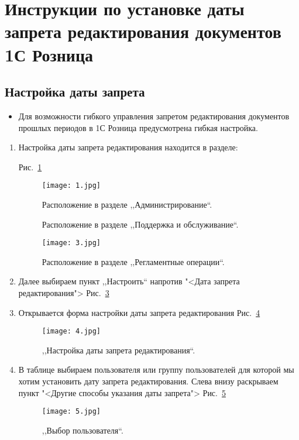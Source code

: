 \section{Инструкции по установке даты запрета редактирования документов 1С Розница}

\subsection{Настройка даты запрета}

\begin{itemize}
	\item Для возможности гибкого управления запретом редактирования документов прошлых периодов в 1С Розница предусмотрена гибкая настройка.
\end{itemize}	
\begin{enumerate}	
	\item Настройка даты запрета редактирования находится в разделе:\par 
	 Рис.~\ref{ris:1.jpg}
	\begin{figure}[H]
		\texttt{[image: 1.jpg]}
		\caption{Расположение в разделе ,,Администрирование``.}
		\label{ris:1.jpg}
	\end{figure}
	\begin{figure}[H]
	
		\caption{Расположение в разделе ,,Поддержка и обслуживание``.}
		\label{ris:2.jpg}
	\end{figure}
	\begin{figure}[H]
		\texttt{[image: 3.jpg]}
		\caption{Расположение в разделе ,,Регламентные операции``.}
		\label{ris:3.jpg}
	\end{figure}
	


	\item Далее выбираем пункт ,,Настроить`` напротив "<Дата запрета редактирования"> Рис.~\ref{ris:3.jpg}
	
	\item Открывается форма настройки даты запрета редактирования Рис.~\ref{ris:4.jpg}
	\begin{figure}[H]
		\texttt{[image: 4.jpg]}
		\caption{,,Настройка даты запрета редактирования``.}
		\label{ris:4.jpg}
	\end{figure}

	\item В таблице выбираем пользователя или группу пользователей для которой мы хотим установить дату запрета редактирования. Слева внизу раскрываем пункт "<Другие способы указания даты запрета"> Рис.~\ref{ris:5.jpg}
	\begin{figure}[H]
		\texttt{[image: 5.jpg]}
		\caption{,,Выбор пользователя``.}
		\label{ris:5.jpg}
	\end{figure}\par \par 


\end{enumerate}
